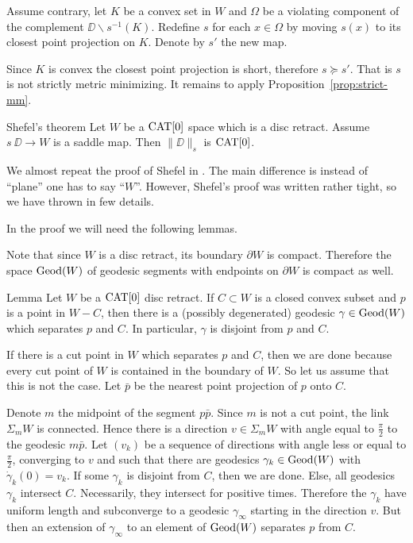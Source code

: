 \documentclass[a4paper,10pt]{amsart}
\begin{document}
Assume contrary, let $K$ be a convex set in $W$
and $\Omega$ be a violating component of the complement $\DD\backslash s^{-1}(K)$.
Redefine $s$ for each $x\in\Omega$ by moving 
$s(x)$ to its closest point projection on $K$.
Denote by $s'$ the new map.

Since $K$ is convex the closest point projection is short,
therefore $s\succcurlyeq s'$.
That is $s$ is not strictly metric minimizing.
It remains to apply Proposition~\ref{prop:strict-mm}.
\qeds

 






\begin{thm}{Shefel's theorem}\label{thm:shefel-2D}
Let $W$ be a $\mathop{\rm CAT}\nolimits[0]$ space which is a disc retract.
Assume $s\:\DD\to W$ is a saddle map. 
Then $\|\DD\|_s$ is $\mathop{\rm CAT}\nolimits[0]$.
\end{thm}

We almost repeat the proof of Shefel in \cite{shefel-2D}.
The main difference is instead of ``plane'' one has to say ``$W$''.
However, Shefel's proof was written rather tight, so we have thrown in few details.

In the proof we will need the following lemmas.

Note that since $W$ is a disc retract, its boundary $\partial W$ is compact. Therefore
the space $\mathop{\rm Geod}\nolimits(W)$ of geodesic segments with endpoints on $\partial W$ is compact as well.

\begin{thm}{Lemma}\label{lem:sepbygeo}
Let $W$ be a $\mathop{\rm CAT}\nolimits[0]$  disc retract. If $C\subset W$ is a closed convex subset and $p$ is a
point in $W-C$, then there is a (possibly degenerated) geodesic $\gamma\in\mathop{\rm Geod}\nolimits(W)$ which separates $p$ and $C$. 
In particular, $\gamma$ is disjoint from $p$ and $C$.
\end{thm}

If there is a cut point in $W$ which separates $p$ and $C$, then we are done because every cut point of $W$
is contained in the boundary of $W$. So let us assume that this is not the case.
Let $\bar p$ be the nearest point projection of $p$ onto $C$. 

Denote $m$ the midpoint of the segment $p\bar p$.
Since $m$ is not a cut point, the link $\Sigma_m W$ is connected. Hence there is a direction $v\in \Sigma_m W$
with angle equal to $\frac{\pi}{2}$ to the geodesic $m\bar p$. Let $(v_k)$ be a sequence of directions with angle 
less or equal to $\frac{\pi}{2}$, converging to
$v$ and such that there are geodesics $\gamma_k\in\mathop{\rm Geod}\nolimits(W)$ with $\dot\gamma_k(0)=v_k$. If some $\gamma_k$
is disjoint from $C$, then we are done. Else, all
geodesics $\gamma_k$ intersect $C$. Necessarily, they intersect for positive times. Therefore the $\gamma_k$ have uniform length
and subconverge to a geodesic $\gamma_\infty$ starting in the direction $v$. But then an extension of $\gamma_\infty$ to an element 
of $\mathop{\rm Geod}\nolimits(W)$ separates $p$ from $C$.
\qeds
\end{document}
